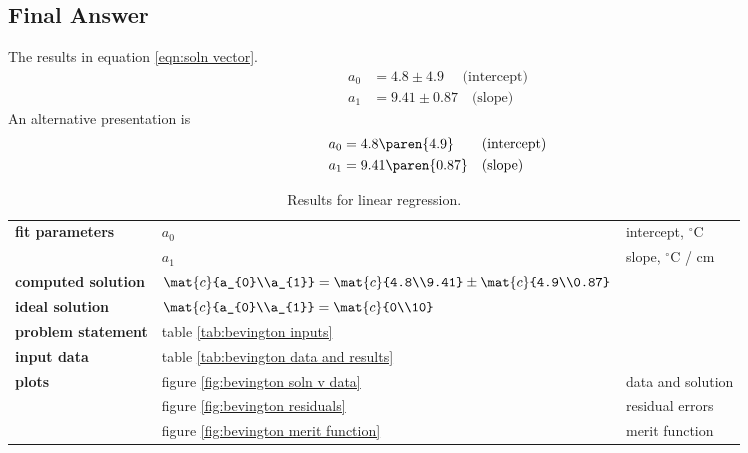 \subsection{Final Answer}  %

The results in equation \eqref{eqn:soln vector}.
  \begin{equation*}
    \begin{split}
      a_{0} &= 4.8 \pm 4.9 \quad \text{\ \ \ (intercept)} \\
      a_{1} &= 9.41 \pm 0.87 \quad \text{(slope)}
    \end{split}
    \label{eqn:soln vector}
  \end{equation*}
An alternative presentation is
  \begin{equation*}
    \begin{split}
      a_{0} &= 4.8 \paren{4.9} \quad \text{\ \ \ (intercept)} \\
      a_{1} &= 9.41 \paren{0.87} \quad \text{(slope)}
    \end{split}
  \end{equation*}

  \begin{table}[htbp]  %
    \caption{Results for linear regression.}
    \begin{center}
      \begin{tabular}{lll}
        \bf{fit parameters} & $a_{0}$ & intercept, $^{\circ}$C \\
                            & $a_{1}$ & slope, $^{\circ}$C / cm \\
        \bf{computed solution} & $\mat{c}{a_{0}\\a_{1}} = \mat{c}{4.8\\9.41} \pm \mat{c}{4.9\\0.87}$ \\
        \bf{ideal solution} & $\mat{c}{a_{0}\\a_{1}} = \mat{c}{0\\10}$ \\\arrayrulecolor{medgray}\hline
        \bf{problem statement} & table \ref{tab:bevington inputs} \\
        \bf{input data}        & table \ref{tab:bevington data and results} \\
        \bf{plots}          & figure \ref{fig:bevington soln v data} & data and solution \\
                            & figure \ref{fig:bevington residuals} & residual errors \\
                            & figure \ref{fig:bevington merit function} & merit function \\
      \end{tabular}
    \end{center}
  \end{table}%

